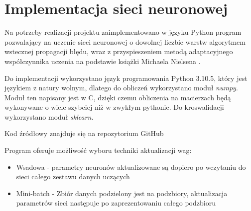 \documentclass[12pt,twoside]{article}
\begin{document}
\section{Implementacja sieci neuronowej}

Na potrzeby realizacji projektu zaimplementowano w języku Python program pozwalający na uczenie sieci neuronowej o dowolnej liczbie warstw algorytmem wstecznej propagacji błędu, wraz z przyspieszeniem metodą adaptacyjnego współczynnika uczenia na podstawie książki Michaela Nielsena \cite{nielsen}.  

Do implementacji wykorzystano język programowania Python 3.10.5, który jest językiem z natury wolnym, dlatego do obliczeń wykorzystano moduł \textit{numpy}. Moduł ten napisany jest w C, dzięki czemu obliczenia na macierzach będą wykonywane o wiele szybciej niż w zwykłym pythonie. Do kroswalidacji wykorzystano moduł \textit{sklearn}.

Kod źródłowy znajduje się na repozytorium GitHub \cite{github}


Program oferuje możliwość wyboru techniki aktualizacji wag:
\begin{itemize}
\item Wsadowa -  parametry neuronów aktualizowane są dopiero po wczytaniu do sieci całego zestawu danych uczących
\item Mini-batch -  Zbiór danych podzielony jest na podzbiory, aktualizacja parametrów sieci następuje po zaprezentowaniu całego podzbioru

\end{itemize}
\end{document}
